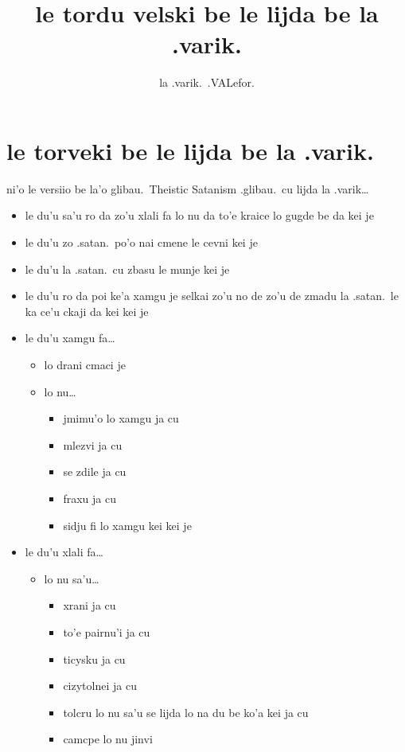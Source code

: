 \documentclass{article}
\title{le tordu velski be le lijda be la .varik.}
\author{la .varik.\ .VALefor.}
\begin{document}
\maketitle

\section{le torveki be le lijda be la .varik.}

ni'o le versiio be la'o glibau.\ Theistic Satanism .glibau.\ cu lijda la .varik\ldots

\begin{itemize}
	\item le du'u sa'u ro da zo'u xlali fa lo nu da to'e kraice lo gugde be da kei je
	\item le du'u zo .satan.\ po'o nai cmene le cevni kei je
	\item le du'u la .satan.\ cu zbasu le munje kei je
	\item le du'u ro da poi ke'a xamgu je selkai zo'u no de zo'u de zmadu la .satan.\ le ka ce'u ckaji da kei kei je
	\item le du'u xamgu fa\ldots{}
	\begin{itemize}
		\item lo drani cmaci je
		\item lo nu\ldots{}
		\begin{itemize}
			\item jmimu'o lo xamgu ja cu
			\item mlezvi ja cu
			\item se zdile ja cu
			\item fraxu ja cu
			\item sidju fi lo xamgu kei kei je
		\end{itemize}
	\end{itemize}
	\item le du'u xlali fa\ldots{}
	\begin{itemize}
		\item lo nu sa'u\ldots{}
		\begin{itemize}
			\item xrani ja cu
			\item to'e pairnu'i ja cu
			\item ticysku ja cu
			\item cizytolnei ja cu
			\item tolcru lo nu sa'u se lijda lo na du be ko'a kei ja cu
			\item camcpe lo nu jinvi
		\end{itemize}
	\end{itemize}
\end{itemize}
\end{document}
